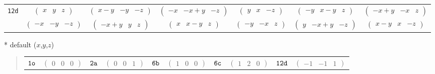 \documentclass[fleqn,9pt,landscape]{jsarticle}
\begin{document}
\begin{center}
\begin{longtable}{ccccccc}
{\tt 12d} & $ \begin{pmatrix} x & y & z \end{pmatrix} $ & $ \begin{pmatrix} x - y & - y & - z \end{pmatrix} $ & $ \begin{pmatrix} - x & - x + y & - z \end{pmatrix} $ & $ \begin{pmatrix} y & x & - z \end{pmatrix} $ & $ \begin{pmatrix} - y & x - y & z \end{pmatrix} $ & $ \begin{pmatrix} - x + y & - x & z \end{pmatrix} $ \\
& $ \begin{pmatrix} - x & - y & - z \end{pmatrix} $ & $ \begin{pmatrix} - x + y & y & z \end{pmatrix} $ & $ \begin{pmatrix} x & x - y & z \end{pmatrix} $ & $ \begin{pmatrix} - y & - x & z \end{pmatrix} $ & $ \begin{pmatrix} y & - x + y & - z \end{pmatrix} $ & $ \begin{pmatrix} x - y & x & - z \end{pmatrix} $ \\
\end{longtable}
\end{center}
* default ($x$,$y$,$z$)
\begin{quote}
\begin{tabular}{cccccccccc}
$ {\tt 1o} $ & $ \begin{pmatrix} 0 & 0 & 0 \end{pmatrix} $ & $ {\tt 2a} $ & $ \begin{pmatrix} 0 & 0 & 1 \end{pmatrix} $ & $ {\tt 6b} $ & $ \begin{pmatrix} 1 & 0 & 0 \end{pmatrix} $ & $ {\tt 6c} $ & $ \begin{pmatrix} 1 & 2 & 0 \end{pmatrix} $ & $ {\tt 12d} $ & $ \begin{pmatrix} -1 & -1 & 1 \end{pmatrix} $
\end{tabular}
\end{quote}
\end{document}
